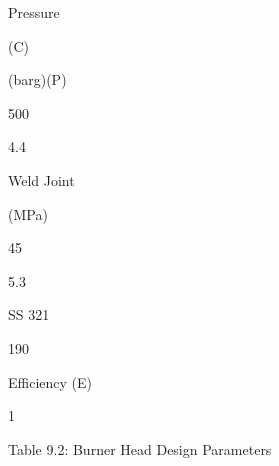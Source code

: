\documentclass[a4paper,portrait,12pt]{article}
\begin{document}
\begin{flushleft}
Pressure
\end{flushleft}





\begin{flushleft}
(C)
\end{flushleft}





\begin{flushleft}
(barg)(P)
\end{flushleft}





500





4.4





\begin{flushleft}
Weld Joint
\end{flushleft}





\begin{flushleft}
(MPa)
\end{flushleft}


45





5.3





\begin{flushleft}
SS 321
\end{flushleft}





190





\begin{flushleft}
Efficiency (E)
\end{flushleft}


1





\begin{flushleft}
Table 9.2: Burner Head Design Parameters
\end{flushleft}
\end{document}
